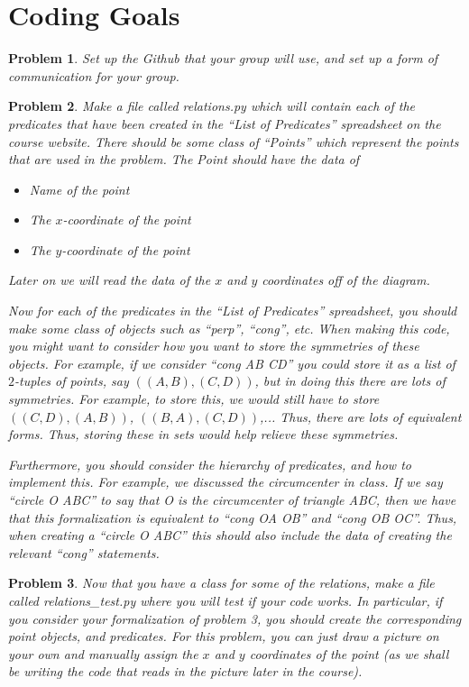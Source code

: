 \documentclass{article}
\newtheorem{problem}{Problem}
\begin{document}
\newpage

\section{Coding Goals}

\begin{problem}
    Set up the Github that your group will use, and set up a form of communication for your group.  
\end{problem} 

\begin{problem}
    Make a file called relations.py which will contain each of the predicates that have been created in the ``List of Predicates'' spreadsheet on the course website. There should be some class of ``Points'' which represent the points that are used in the problem. The Point should have the data of
    \begin{itemize}
        \item Name of the point
        \item The $x$-coordinate of the point
        \item The $y$-coordinate of the point
    \end{itemize}
    Later on we will read the data of the $x$ and $y$ coordinates off of the diagram. 

    Now for each of the predicates in the ``List of Predicates'' spreadsheet, you should make some class of objects such as ``perp'', ``cong'', etc. When making this code, you might want to consider how you want to store the symmetries of these objects. For example, if we consider ``cong AB CD'' you could store it as a list of $2$-tuples of points, say $((A,B),(C,D))$, but in doing this there are lots of symmetries. For example, to store this, we would still have to store $((C,D), (A,B))$, $((B,A),(C,D))$,... Thus, there are lots of equivalent forms. Thus, storing these in sets would help relieve these symmetries. 

    Furthermore, you should consider the hierarchy of predicates, and how to implement this. For example, we discussed the circumcenter in class. If we say ``circle O ABC'' to say that O is the circumcenter of triangle ABC, then we have that this formalization is equivalent to ``cong OA OB'' and ``cong OB OC''. Thus, when creating a ``circle O ABC'' this should also include the data of creating the relevant ``cong'' statements. 
\end{problem}

 \begin{problem}
        Now that you have a class for some of the relations, make a file called relations\_test.py where you will test if your code works. In particular, if you consider your formalization of problem 3, you should create the corresponding point objects, and predicates. For this problem, you can just draw a picture on your own and manually assign the $x$ and $y$ coordinates of the point (as we shall be writing the code that reads in the picture later in the course). 
\end{problem}
\end{document}
